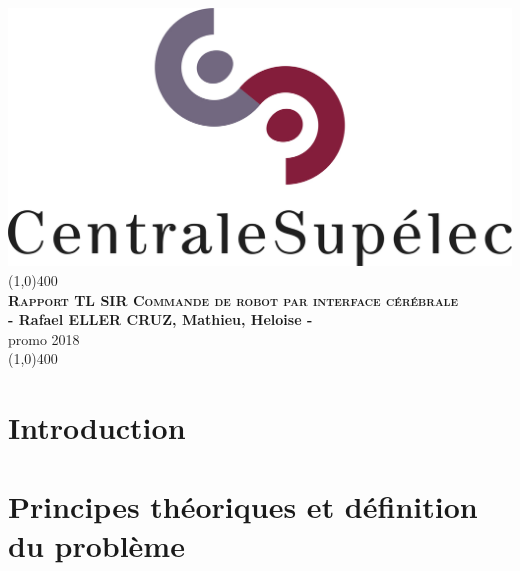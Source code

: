 \documentclass[11pt]{article}
\begin{document}

\begin{titlepage}
\begin{center}
\includegraphics[scale=0.5]{CentraleSupelec.jpeg}\\
\vfill
\line(1,0){400}\\[1mm]
\huge{\textsc{\textbf{Rapport TL SIR Commande de robot par interface cérébrale}}}\\[3mm]
\Large{\textbf{- Rafael ELLER CRUZ, Mathieu, Heloise -}}\\[1mm]
\Large{promo 2018}\\[1mm]
\line(1,0){400}\\[1mm]
\vfill
\end{center}
\end{titlepage}


\tableofcontents
\thispagestyle{empty}
\cleardoublepage


\setcounter{page}{1}
\section{Introduction}


\cleardoublepage


\section{Principes théoriques et définition du problème}
\end{document}
